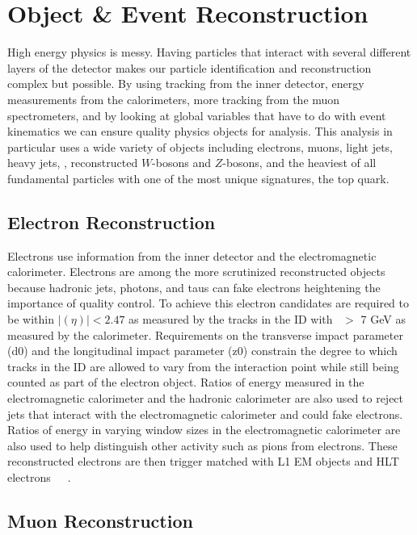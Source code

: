 \chapter{Object \& Event Reconstruction}
\label{SECTION-OBJ}

High energy physics is messy. Having particles that interact with several different layers of the detector makes our particle identification and reconstruction complex but possible. By using tracking from the inner detector, energy measurements from the calorimeters, more tracking from the muon spectrometers, and by looking at global variables that have to do with event kinematics we can ensure quality physics objects for analysis. This analysis in particular uses a wide variety of objects including electrons, muons, light jets, heavy jets, \met, reconstructed $W$-bosons and $Z$-bosons, and the heaviest of all fundamental particles with one of the most unique signatures, the top quark. 


\section{Electron Reconstruction}
\label{SECTION-OBJ-EL}

Electrons use information from the inner detector and the electromagnetic calorimeter. Electrons are  among the more scrutinized reconstructed objects because hadronic jets, photons, and taus can fake electrons heightening the importance of quality control. To achieve this electron candidates are required to be within $|(\eta)| < 2.47$ as measured by the tracks in the ID with \PT~$>$ 7 GeV as measured by the calorimeter. Requirements on the transverse impact parameter (d0) and the longitudinal impact parameter (z0) constrain the degree to which tracks in the ID are allowed to vary from the interaction point while still being counted as part of the electron object. Ratios of energy measured in the electromagnetic calorimeter and the hadronic calorimeter are also used to reject jets that interact with the electromagnetic calorimeter and could fake electrons. Ratios of energy in varying window sizes in the electromagnetic calorimeter are also used to help distinguish other activity such as pions from electrons. These reconstructed electrons are then trigger matched with L1 EM objects and HLT electrons~\cite{Electrons}~\cite{ElEffiRecomm}~\cite{ELECTRON-RECO}.


\section{Muon Reconstruction}
\label{SECTION-OBJ-MU}

